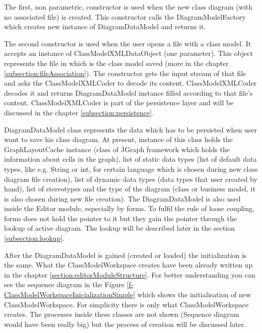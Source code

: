 The first, non parametric, constructor is used when the new class diagram (with no associated file) is created. This constructor calls the DiagramModelFactory which creates new instance of DiagramDataModel and returns it.

The second constructor is used when the user opens a file with a class model. It accepts an instance of ClassModelXMLDataObject (one parameter). This object represents the file in which is the class model saved (more in the chapter \ref{subsection:fileAssociation}). The constructor gets the input stream of that file and asks the ClassModelXMLCoder to decode its content. ClassModelXMLCoder decodes it and returns DiagramDataModel instance filled according to that file's content. ClassModelXMLCoder is part of the persistence layer and will be discussed in the chapter \ref{subsection:persistence}.

DiagramDataModel class represents the data which has to be persisted when user want to save his class diagram. At present, instance of this class holds the GraphLayoutCache instance (class of JGraph framework which holds the information about cells in the graph), list of static data types (list of default data types, like e.g. String or int, for certain language which is chosen during new class diagram file creation), list of dynamic data types (data types that user created by hand), list of stereotypes and the type of the diagram (class or business model, it is also chosen during new file creation). The DiagramDataModel is also used inside the Editor module, especially by forms. To fulfil the rule of loose coupling, forms does not hold the pointer to it but they gain the pointer through the lookup of active diagram. The lookup will be described later in the section \ref{subsection:lookup}.

After the DiagramDataModel is gained (created or loaded) the initialization is the same. What the ClassModelWorkspace creates have been already written up in the chapter \ref{section:editorModuleStructure}. For better understanding you can see the sequence diagram in the Figure \ref{f-ClassModelWorkspaceInicializationSimple} which shows the initialisation of new ClassModelWorkspace. For simplicity there is only what ClassModelWorkspace creates. The processes inside these classes are not shown (Sequence diagram would have been really big) but the process of creation will be discussed later.

